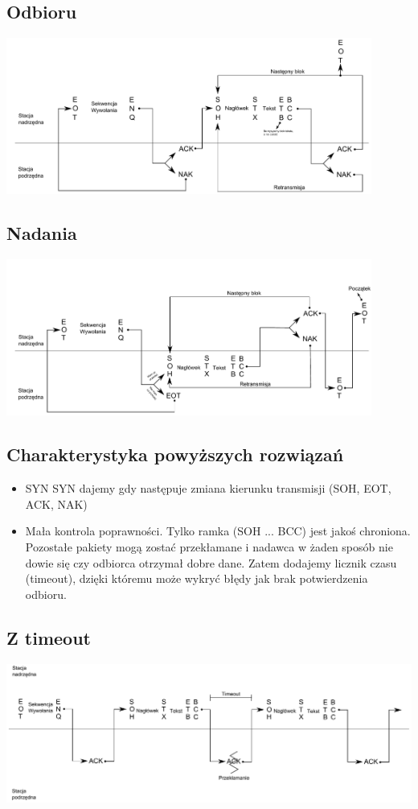 \documentclass[a4paper,twoside]{article}
\begin{document}
	\subsection{Odbioru}
	\includegraphics[width=12cm]{./images/image06.pdf}
	\subsection{Nadania}
	\includegraphics[width=12cm]{./images/image07.pdf}
	\subsection{Charakterystyka powyższych rozwiązań}
	\begin{itemize}
		\item SYN SYN dajemy gdy następuje zmiana kierunku transmisji (SOH, EOT, ACK, NAK)
		\item Mała kontrola poprawności. Tylko ramka (SOH ... BCC) jest jakoś chroniona. Pozostałe pakiety mogą zostać przekłamane i nadawca w żaden sposób nie dowie się czy odbiorca otrzymał dobre dane. Zatem dodajemy licznik czasu (timeout), dzięki któremu może wykryć błędy jak brak potwierdzenia odbioru.
	\end{itemize}
	\subsection{Z timeout}
	\includegraphics[width=14cm]{./images/image08.pdf}
\end{document}
